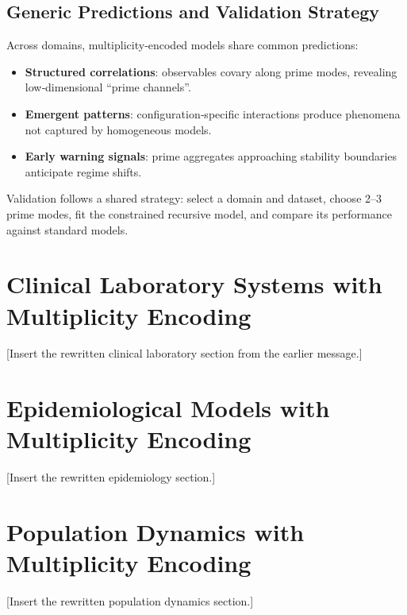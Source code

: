 \documentclass[11pt]{article}
\begin{document}
\subsection{Generic Predictions and Validation Strategy}

Across domains, multiplicity‑encoded models share common predictions:
\begin{itemize}
    \item \textbf{Structured correlations}: observables covary along prime modes, revealing low‑dimensional “prime channels”.
    \item \textbf{Emergent patterns}: configuration‑specific interactions produce phenomena not captured by homogeneous models.
    \item \textbf{Early warning signals}: prime aggregates approaching stability boundaries anticipate regime shifts.
\end{itemize}
Validation follows a shared strategy: select a domain and dataset, choose 2–3 prime modes, fit the constrained recursive model, and compare its performance against standard models.

\section{Clinical Laboratory Systems with Multiplicity Encoding}
\label{sec:lab}

[Insert the rewritten clinical laboratory section from the earlier message.]

\section{Epidemiological Models with Multiplicity Encoding}
\label{sec:epi}

[Insert the rewritten epidemiology section.]

\section{Population Dynamics with Multiplicity Encoding}
\label{sec:pop}

[Insert the rewritten population dynamics section.]

\end{document}
